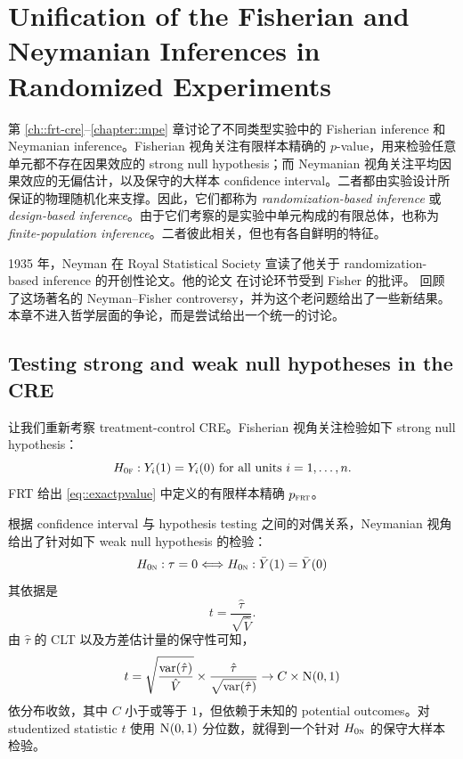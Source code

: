 \chapter{Unification of the Fisherian and Neymanian Inferences in Randomized Experiments}\label{chapter::unification-fisher-neyman}
第 \ref{ch::frt-cre}--\ref{chapter::mpe} 章讨论了不同类型实验中的 Fisherian inference 和 Neymanian inference。Fisherian 视角关注有限样本精确的 $p$-value，用来检验任意单元都不存在因果效应的 strong null hypothesis；而 Neymanian 视角关注平均因果效应的无偏估计，以及保守的大样本 confidence interval。二者都由实验设计所保证的物理随机化来支撑。因此，它们都称为 {\it randomization-based inference} 或 {\it design-based inference}。由于它们考察的是实验中单元构成的有限总体，也称为 {\it finite-population inference}。二者彼此相关，但也有各自鲜明的特征。

1935 年，Neyman 在 Royal Statistical Society 宣读了他关于 randomization-based inference 的开创性论文。他的论文 \citep{neyman1935statistical} 在讨论环节受到 Fisher 的批评。\cite{sabbaghi2014comments} 回顾了这场著名的 Neyman--Fisher controversy，并为这个老问题给出了一些新结果。本章不进入哲学层面的争论，而是尝试给出一个统一的讨论。

\section{Testing strong and weak null hypotheses in the CRE} 
 \label{sec::strong-weak-cre-frt}
 
 
让我们重新考察 treatment-control CRE。Fisherian 视角关注检验如下 strong null hypothesis：
$$
H_{0\textsc{f}}: Y_i(1) = Y_i(0) \text{ for all units } i=1,\ldots, n.
$$
FRT 给出 \eqref{eq::exactpvalue} 中定义的有限样本精确 $p_{\textsc{frt}}$。
 
 
根据 confidence interval 与 hypothesis testing 之间的对偶关系，Neymanian 视角给出了针对如下 weak null hypothesis 的检验：
$$
H_{0\textsc{n}} : \tau = 0  \Longleftrightarrow H_{0\textsc{n}}: \bar{Y}(1) = \bar{Y}(0)
$$ 
其依据是
$$
t= 
\frac{\hat{\tau} }{  \sqrt{  \hat{V}    } }  .
$$
由 $\hat\tau$ 的 CLT 以及方差估计量的保守性可知，
$$
t  =   \sqrt{  \frac{ \var(\hat{\tau}) }{ \hat{V} } } \times  \frac{\hat{\tau} }{  \sqrt{  \var(\hat{\tau})   } }    \rightarrow  C \times   \N01 
$$
依分布收敛，其中 $C$ 小于或等于 $1$，但依赖于未知的 potential outcomes。对 studentized statistic $t$ 使用 $\N01$ 分位数，就得到一个针对 $H_{0\textsc{n}}$ 的保守大样本检验。

